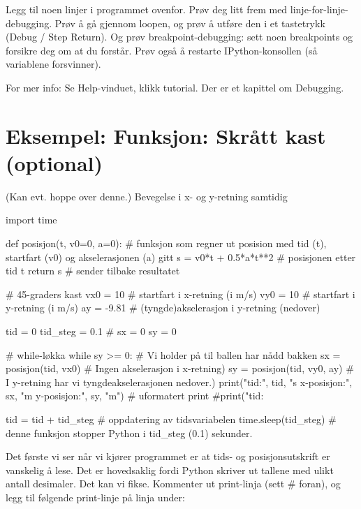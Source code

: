 \begin{exercise}
Legg til noen linjer i programmet ovenfor. Prøv deg litt frem med linje-for-linje-debugging. Prøv å gå gjennom loopen, og prøv å utføre den i et tastetrykk (Debug / Step Return). Og prøv breakpoint-debugging: sett noen breakpoints og forsikre deg om at du forstår. Prøv også å restarte IPython-konsollen (så variablene forsvinner). 
\end{exercise}

For mer info: Se Help-vinduet, klikk tutorial. Der er et kapittel om Debugging.

\section {Eksempel: Funksjon: Skrått kast (optional)}

(Kan evt. hoppe over denne.)
Bevegelse i x- og y-retning samtidig

\begin{usncodebox}
import time

def posisjon(t, v0=0, a=0):    # funksjon som regner ut posision med tid (t), startfart (v0) og akselerasjonen (a) gitt
    s = v0*t + 0.5*a*t**2      # posisjonen etter tid t
    return s                   # sender tilbake resultatet
    

# 45-graders kast
vx0 = 10         # startfart i x-retning (i m/s)
vy0 = 10         # startfart i y-retning (i m/s)
ay = -9.81       # (tyngde)akselerasjon i y-retning (nedover)

tid = 0
tid_steg = 0.1   # 
sx = 0
sy = 0

# while-løkka
while sy >= 0:                    # Vi holder på til ballen har nådd bakken 
    sx = posisjon(tid, vx0)       # Ingen akselerasjon i x-retning) 
    sy = posisjon(tid, vy0, ay)   # I y-retning har vi tyngdeakselerasjonen nedover.)
    print("tid:", tid, "s   x-posisjon:", sx, "m   y-posisjon:", sy, "m")              # uformatert print
    #print("tid: %

    tid = tid + tid_steg          # oppdatering av tidsvariabelen
    time.sleep(tid_steg)          # denne funksjon stopper Python i tid_steg (0.1) sekunder. 
\end{usncodebox}

Det første vi ser når vi kjører programmet er at tids- og posisjonsutskrift er vanskelig å lese. Det er hovedsaklig fordi Python skriver ut tallene med ulikt antall desimaler. Det kan vi fikse. Kommenter ut print-linja (sett \# foran), og legg til følgende print-linje på linja under:

